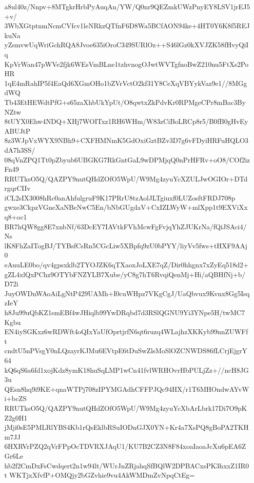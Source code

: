 a8ul40z/Nnpv+8MTgkrHrbPyAuqAn/YW/Q0nr9QEZmkUWzPnyEY8LSV1jrEJ5+v/
3WbXGtptnmNcmCVfcv1leNRkzQTfnF6D8Wa5BCfAON94ke+4HT0Y6K8f5REJkuNa
yZsmvwUqWriGchRQA8Jvoe635iOroC349SURlOz++S46lGz0kXVJZK58fHvyQiIq
KpVrWan47pWVe2fjk6WEsVmBLne1tzhvnogOJwtWVTgfnoBwZ210nu5FtXs2PoHR
1qE4mRahIP5f4EaQd6XGmOHo1bZVrVctO2kf31Y8CeXqVBYykVaz9e1//8MGgdWQ
Tb43EtHEWdtPfG+s65zaXhbUkYpUt/O8qwtxZkPdvKr0RPMgeCPr8mBac3ByNZtw
8tUYX0Ehw4NDQ+XHj7WOITxz1RH6WHm/W83zCiBoLRCp8r5/B0fB0gHvEyABUJtP
8z3WJpVxWYX9NBh9+CXFHMNmK5GdOxiGztBZv3D7g6vFDyiHRFuHQLO3dA7h3SS/
08qVnZPQ1Tt0pZbyub6UBGKG7RkGntGaL9wDPMjqQ0nPrHFRv+oO8/COf2izFn49
RRUTksO5Q/QAZPY9nutQHdZOfO5WpU/W9Mg4zyuYcXZULJwOGIOr+DTdrgqrCIIv
iCL2sIX3008hRc0anAhfulgruF9K17PRrU8tzAolJLTgiuxf0LUZosftFRDJ708p
gwxe3CkpzVGneXaNBeNwC5En/bNbGUgdaV+CxIZLWyW+mlXpp1t9EXViXxq8+oc1
BR7hQW8gg8E7xnbNf/63DcEY7IAVtkFVhMcwFgFvjqYhZJUKrNa/fQiJSAci4/Ns
lK8FhZaITogBJ/TYBsfCsRn5CGcLiw5XBpfq9zU0bPYY/liyVv5fws+tHXF9AAj0
eAuuLE0bo/qv4gpsxklb2TYOJZK6qTXaoxJoLXE7qZ/Dir0hhgnx7xZyEq518d2+
gZL4xlQxPChz9OTYbFNZYLB7Xube/yC8g7hT6RvqiQenMj+Hi/aQBHfNj+b/D72i
JuyOWDnWAoAiLgNtP429UAMh+I0cuWHpz7VKgCgJ/UaQbvux9Kvnx8Gg5IsqzIeY
h8Ju99uQbKZ1smEBf4wJHiqlb99YwDRqbd7d3RSlQGNU9Yi3YNpe5H/twMC7Kgbu
EN4iySGKxz6wRDWft4oQIxYaUfOprtjrfN6qt6ruzq4WLajhzXKKyb99nnZUWFft
cndtU5nPVsgY0nLQzayrKJMu6EVtpE6tDuSwZlsMoSlOZCNWDS86fLCrjEjgrY64
kQ6qS6a6fd1xojKdz8ymK18huSqLMP1wCn41fvlWRHOvrHbPULjZz+//ncH8JG3u
QEsn8hq9i9KE+qnaWTPj708zIPYMGAdhCFFPJQc94HX/r1T6MHOndwAYvWi+bcZS
RRUTksO5Q/QAZPY9nutQHdZOfO5WpU/W9Mg4zyuYcXbArLbrk17Di7O9pKZ2g0H1
jMji0sE5PMLRlYBS4Kb1rQsEklbRSuIODnGJX0YN+Kr4a7XsPQ8gBoPA2TKHm7JJ
6HXRVrPZQ2qVrFPpOcTDVRXJAqU1/KU7B2CZ3N8F84xoaIaoaJcXu6pEA6ZGr6Le
hb2f2CmDxFsCwdqert2n1w94lt/WUrJnZRjahqSfBQlW2DPBACxsPK3hxxZ1IR0t
WKTjxXfvfP+OMQjy2bGZvhie9vu4AkWMDmZvNpqCtEg=
